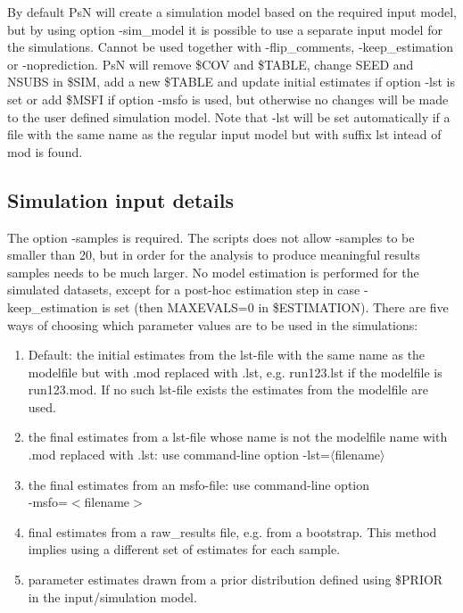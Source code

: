 \begin{optionlist}
\nextopt
{}
By default PsN will create a simulation model based on the required input model, but by using option -sim\_model it is possible to use a separate input model for the simulations. Cannot be used together with -flip\_comments, -keep\_estimation or -noprediction. PsN will remove \$COV and \$TABLE, change SEED and NSUBS in \$SIM, add a new \$TABLE and  update initial estimates if option -lst is set or add \$MSFI if option -msfo is used, but otherwise no changes will be made to the user defined simulation model. Note that -lst will be set automatically if a file with the same name as the regular input model but with suffix lst intead of mod is found. 
\nextopt
\end{optionlist}


\subsection{Simulation input details}
The option -samples is required. The scripts does not allow -samples to be smaller than 20, but in order for the analysis to produce meaningful results samples needs to be much larger. No model estimation is performed for the simulated datasets, except for a post-hoc estimation step in case -keep\_estimation is set (then MAXEVALS=0 in \$ESTIMATION). There are five ways of choosing which parameter values are to be used in the simulations: 

\begin{enumerate}
	\item Default: the initial estimates from the lst-file with the same name as the modelfile but with .mod replaced with .lst, e.g. run123.lst if the modelfile is run123.mod. If no such lst-file exists the estimates from the modelfile are used.
	\item the final estimates from a lst-file whose name is not the modelfile name with .mod replaced with .lst: use command-line option -lst=$\langle$filename$\rangle$
	\item the final estimates from an msfo-file: use command-line option\\ -msfo=$<$filename$>$
	\item final estimates from a raw\_results file, e.g. from a bootstrap. This method implies using a different set of estimates for each sample. 
	\item parameter estimates drawn from a prior distribution defined using \$PRIOR in the input/simulation model.
\end{enumerate}

